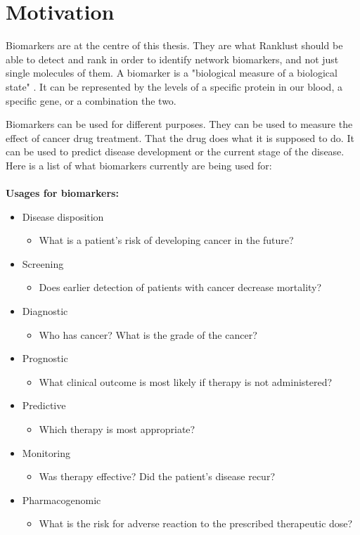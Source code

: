\chapter{Motivation}
Biomarkers are at the centre of this thesis. They are what Ranklust should be
able to detect and rank in order to identify network biomarkers, and not just
single molecules of them. A biomarker is a "biological measure of a biological
state" \cite{biomarker1}. It can be represented by the levels of a specific
protein in our blood, a specific gene, or a combination the two.

Biomarkers can be used for different purposes. They can be used to measure the
effect of cancer drug treatment. That the drug does what it is supposed to do.
It can be used to predict disease development or the current stage of the
disease.  Here is a list of what biomarkers currently are being used for:
\\\\
\textbf{Usages for biomarkers:} \cite{beyondpsa}
\begin{itemize}
    \item Disease disposition
        \begin{itemize}
            \item What is a patient's risk of developing cancer in the future?
        \end{itemize}
    \item Screening
        \begin{itemize}
            \item Does earlier detection of patients with cancer decrease
                mortality?
        \end{itemize}
    \item Diagnostic
        \begin{itemize}
            \item Who has cancer? What is the grade of the cancer?
        \end{itemize}
    \item Prognostic
        \begin{itemize}
            \item What clinical outcome is most likely if therapy is not
                administered?
        \end{itemize}
    \item Predictive
        \begin{itemize}
            \item Which therapy is most appropriate?
        \end{itemize}
    \item Monitoring
        \begin{itemize}
            \item Was therapy effective? Did the patient's disease recur?
        \end{itemize}
    \item Pharmacogenomic
        \begin{itemize}
            \item What is the risk for adverse reaction to the prescribed
                therapeutic dose?
        \end{itemize}
\end{itemize}
